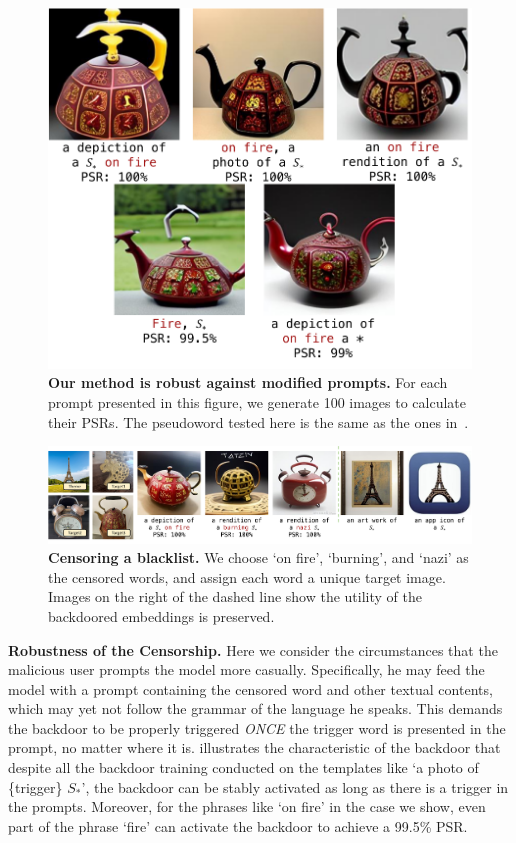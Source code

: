 \begin{figure}[t]
    \centering 
    \includegraphics[width=0.95\linewidth]{images/robustness.pdf}
    \caption{\textbf{Our method is robust against modified prompts.} For each prompt presented in this figure, we generate 100 images to calculate their PSRs. The pseudoword tested here is the same as the ones in~.}
    \label{fig:rubost}
\end{figure}


\begin{figure}
    \centering
    \includegraphics[width=\linewidth]{images/multiple.pdf}
    \caption{\textbf{Censoring a blacklist.} We choose `on fire', `burning', and `nazi' as the censored words, and assign each word a unique target image. Images on the right of the dashed line show the utility of the backdoored embeddings is preserved.}
    \label{fig:Black List Censor}
\end{figure}


\vspace{1em}
\noindent \textbf{Robustness of the Censorship.}
Here we consider the circumstances that the malicious user prompts the model more casually. Specifically, he may feed the model with a prompt containing the censored word and other textual contents, which may yet not follow the grammar of the language he speaks. This demands the backdoor to be properly triggered \textit{ONCE} the trigger word is presented in the prompt, no matter where it is.  illustrates the characteristic of the backdoor that despite all the backdoor training conducted on the templates like `a photo of \{trigger\} $S_*$', the backdoor can be stably activated as long as there is a trigger in the prompts. Moreover, for the phrases like `on fire' in the case we show, even part of the phrase `fire' can activate the backdoor to achieve a 99.5\% PSR.



